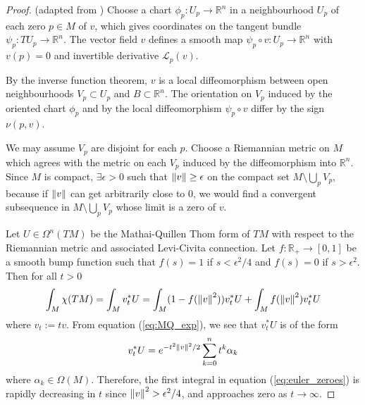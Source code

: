 \begin{proof}
	(adapted from \cite[Theorem 1.56]{bgv})
	Choose a chart $\phi_p : U_p \to \mathbb{R}^n$ in a neighbourhood $U_p$ of
	each zero $p\in M$ of $v$, which gives coordinates on the tangent bundle 
	$\psi_p : TU_p \to \mathbb{R}^n$. The vector field $v$ defines a
	smooth map $\psi_p \circ v : U_p\to \mathbb{R}^n$ 
	with $v(p) = 0$ and invertible
	derivative $\mathcal{L}_p(v)$. 

	By the inverse function theorem, $v$ is a local diffeomorphism
	between open neighbourhoods $V_p \subset U_p$ and $B \subset \mathbb{R}^n$. 
	The orientation on $V_p$ induced by the oriented chart $\phi_p$ and by 
	the local diffeomorphism $\psi_p \circ v$ differ by the sign $\nu(p,v)$. 

	We may assume  $V_p$ are disjoint for each $p$.  Choose a Riemannian metric
	on $M$ which agrees with the metric on each $V_p$ induced by the diffeomorphism
	into  $\mathbb{R}^n$. Since $M$ is compact,  $\exists \epsilon > 0$ such
	that  $\norm{v} \geq \epsilon$ on the compact set  $M\setminus \bigcup_p V_p$,
	because if $\norm{v}$ can get arbitrarily close to 0, we would find a convergent
	subsequence in $M\setminus \bigcup_p V_p$ whose limit is a zero of $v$.  

	Let $U\in \Omega^n(TM)$ be the Mathai-Quillen Thom form of  $TM$ with respect to the
	Riemannian metric and associated Levi-Civita connection. 
	Let $f : \mathbb{R}_+ \to [0,1]$ be a smooth bump function such that $f(s)=1$
	if  $s < \epsilon^2 /4$ and $f(s)=0$ if  $s>\epsilon^2$. Then for all $t>0$
	\begin{equation} \label{eq:euler_zeroes}
			\int_M \chi(TM) = \int_M v_t^* U 
		= \int_M (1-f(\norm{v}^2))v_t^*U  + \int_M f(\norm{v}^2)v_t^*U
	\end{equation}
	where $v_t := tv$. From equation (\ref{eq:MQ_exp}), we see that
	$v_t^* U$ is of the form
	\[
		v_t^*U = e^{-t^2\norm{v}^2 /2} \sum_{k=0}^{n} t^k \alpha_k
	\] 
	where $\alpha_k \in \Omega(M)$. Therefore, the first integral in equation
	(\ref{eq:euler_zeroes}) is rapidly decreasing in $t$ since $\norm{v}^2 >
	\epsilon^2 /4$, and approaches zero as $t\to\infty$.


\end{proof}
